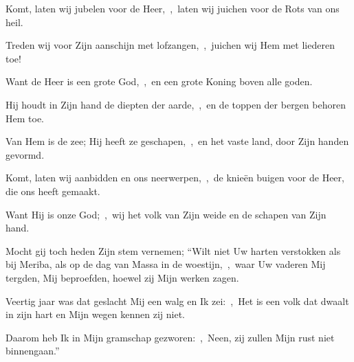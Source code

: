 \documentclass[12pt,twoside,a5paper]{article}
\begin{document}
\begin{halfparskip}

  Komt, laten wij jubelen voor de Heer,~\sep\ laten wij juichen voor de Rots van ons heil.


  Treden wij voor Zijn aanschijn met lofzangen,~\sep\ juichen wij Hem met liederen toe!

  Want de Heer is een grote God,~\sep\ en een grote Koning boven alle goden.

  Hij houdt in Zijn hand de diepten der aarde,~\sep\ en de toppen der bergen behoren Hem toe.

  Van Hem is de zee; Hij heeft ze geschapen,~\sep\ en het vaste land, door Zijn handen gevormd.

  Komt, laten wij aanbidden en ons neerwerpen,~\sep\ de knieën buigen voor de Heer, die ons heeft gemaakt.

  Want Hij is onze God;~\sep\ wij het volk van Zijn weide en de schapen van Zijn hand.
\end{halfparskip}

\begin{halfparskip}

  Mocht gij toch heden Zijn stem vernemen; ``Wilt niet Uw harten verstokken als bij Meriba, als op de dag van Massa in de woestijn,~\sep\ waar Uw vaderen Mij tergden, Mij beproefden, hoewel zij Mijn werken zagen.

  Veertig jaar was dat geslacht Mij een walg en Ik zei:~\sep\ Het is een volk dat dwaalt in zijn hart en Mijn wegen kennen zij niet.

  Daarom heb Ik in Mijn gramschap gezworen:~\sep\ Neen, zij zullen Mijn rust niet binnengaan.''
\end{halfparskip}



\end{document}
